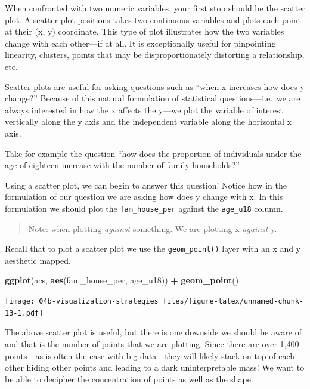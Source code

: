 \documentclass[
]{book}
\newenvironment{Shaded}{\begin{snugshade}}{\end{snugshade}}
\newcommand{\KeywordTok}[1]{\textcolor[rgb]{0.13,0.29,0.53}{\textbf{#1}}}
\newcommand{\NormalTok}[1]{#1}
\newcommand{\OperatorTok}[1]{\textcolor[rgb]{0.81,0.36,0.00}{\textbf{#1}}}
\newcommand{\StringTok}[1]{\textcolor[rgb]{0.31,0.60,0.02}{#1}}
\begin{document}
When confronted with two numeric variables, your first stop should be the scatter plot. A scatter plot positions takes two continuous variables and plots each point at their (x, y) coordinate. This type of plot illustrates how the two variables change with each other---if at all. It is exceptionally useful for pinpointing linearity, clusters, points that may be disproportionately distorting a relationship, etc.

Scatter plots are useful for asking questions such as ``when x increases how does y change?'' Because of this natural formulation of statistical questions---i.e.~we are always interested in how the x affects the y---we plot the variable of interest vertically along the y axis and the independent variable along the horizontal x axis.

Take for example the question ``how does the proportion of individuals under the age of eighteen increase with the number of family households?''

Using a scatter plot, we can begin to answer this question! Notice how in the formulation of our question we are asking how does y change with x. In this formulation we should plot the \texttt{fam\_house\_per} against the \texttt{age\_u18} column.

\begin{quote}
Note: when plotting \emph{against} something. We are plotting x \emph{against} y.
\end{quote}

Recall that to plot a scatter plot we use the \texttt{geom\_point()} layer with an x and y aesthetic mapped.

\begin{Shaded}
\begin{Highlighting}[]
\KeywordTok{ggplot}\NormalTok{(acs, }\KeywordTok{aes}\NormalTok{(fam\_house\_per, age\_u18)) }\OperatorTok{+}
\StringTok{  }\KeywordTok{geom\_point}\NormalTok{()}
\end{Highlighting}
\end{Shaded}

\texttt{[image: 04b-visualization-strategies\_files/figure-latex/unnamed-chunk-13-1.pdf]}

The above scatter plot is useful, but there is one downside we should be aware of and that is the number of points that we are plotting. Since there are over 1,400 points---as is often the case with big data---they will likely stack on top of each other hiding other points and leading to a dark uninterpretable mass! We want to be able to decipher the concentration of points as well as the shape.
\end{document}
